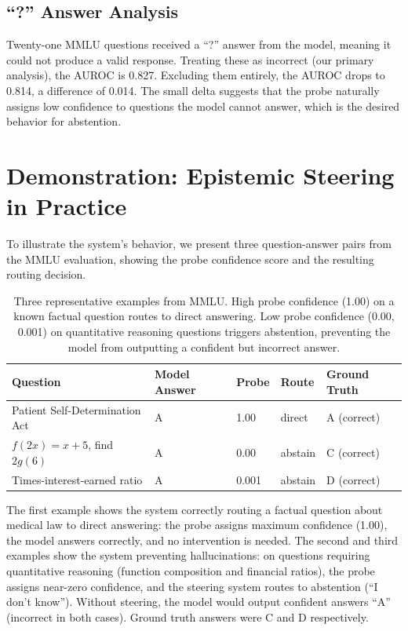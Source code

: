 \documentclass{article}
\begin{document}
\subsection{``?'' Answer Analysis}

Twenty-one MMLU questions received a ``?'' answer from the model, meaning it could not produce a valid response. Treating these as incorrect (our primary analysis), the AUROC is 0.827. Excluding them entirely, the AUROC drops to 0.814, a difference of 0.014. The small delta suggests that the probe naturally assigns low confidence to questions the model cannot answer, which is the desired behavior for abstention.

\section{Demonstration: Epistemic Steering in Practice}

To illustrate the system's behavior, we present three question-answer pairs from the MMLU evaluation, showing the probe confidence score and the resulting routing decision.

\begin{table}[h]
\centering
\caption{Three representative examples from MMLU. High probe confidence (1.00) on a known factual question routes to direct answering. Low probe confidence (0.00, 0.001) on quantitative reasoning questions triggers abstention, preventing the model from outputting a confident but incorrect answer.}
\label{tab:demo}
\begin{tabular}{p{}p{}p{}p{}p{}}
\toprule
\textbf{Question} & \textbf{Model Answer} & \textbf{Probe} & \textbf{Route} & \textbf{Ground Truth} \\
\midrule
Patient Self-Determination Act & A & 1.00 & direct & A (correct) \\
$f(2x)=x+5$, find $2g(6)$ & A & 0.00 & abstain & C (correct) \\
Times-interest-earned ratio & A & 0.001 & abstain & D (correct) \\
\bottomrule
\end{tabular}
\end{table}

The first example shows the system correctly routing a factual question about medical law to direct answering: the probe assigns maximum confidence (1.00), the model answers correctly, and no intervention is needed. The second and third examples show the system preventing hallucinations: on questions requiring quantitative reasoning (function composition and financial ratios), the probe assigns near-zero confidence, and the steering system routes to abstention (``I don't know''). Without steering, the model would output confident answers ``A'' (incorrect in both cases). Ground truth answers were C and D respectively.
\end{document}
